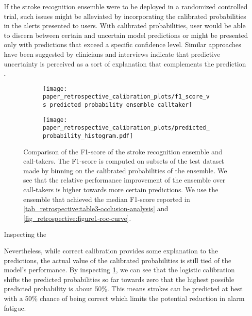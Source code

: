 If the stroke recognition ensemble were to be deployed in a randomized controlled trial, such issues might be alleviated by incorporating the calibrated probabilities in the alerts presented to users. With calibrated probabilities, user would be able to discern between certain and uncertain model predictions or might be presented only with predictions that exceed a specific confidence level. Similar approaches have been suggested by clinicians and interviews indicate that predictive uncertainty is perceived as a sort of explanation that complements the prediction \cite{tonekaboni_what_2019}.


\begin{figure}
    \begin{subfigure}[c]{0.48\columnwidth}
        \centering
        \texttt{[image: paper\_retrospective\_calibration\_plots/f1\_score\_vs\_predicted\_probability\_ensemble\_calltaker]}
    \end{subfigure}    
    \begin{subfigure}[c]{0.48\columnwidth}
        \centering
        \texttt{[image: paper\_retrospective\_calibration\_plots/predicted\_probability\_histogram.pdf]}
    \end{subfigure}    
    \caption[Comparison of F1-score of stroke recognition ensemble and call-takers as function of predicted probability.]{ Comparison of the F1-score of the stroke recognition ensemble and call-takers. The F1-score is computed on subsets of the test dataset made by binning on the calibrated probabilities of the ensemble. We see that the relative performance improvement of the ensemble over call-takers is higher towards more certain predictions. We use the ensemble that achieved the median F1-score reported in \cref{tab_retrospective:table3-occlusion-analysis} and \cref{fig_retrospective:figure1-roc-curve}.}
    \label{fig_discussion:retrospective-paper-calibration-curve-sigmoid-isotonic}
\end{figure}    

Inspecting the 


Nevertheless, while correct calibration provides some explanation to the predictions, the actual value of the calibrated probabilities is still tied of the model's performance. By inspecting \cref{fig_discussion:retrospective-paper-calibration-curve-sigmoid-isotonic}, we can see that the logistic calibration shifts the predicted probabilities so far towards zero that the highest possible predicted probability is about 50\%. This means strokes can be predicted at best with a 50\% chance of being correct which limits the potential reduction in alarm fatigue. 

